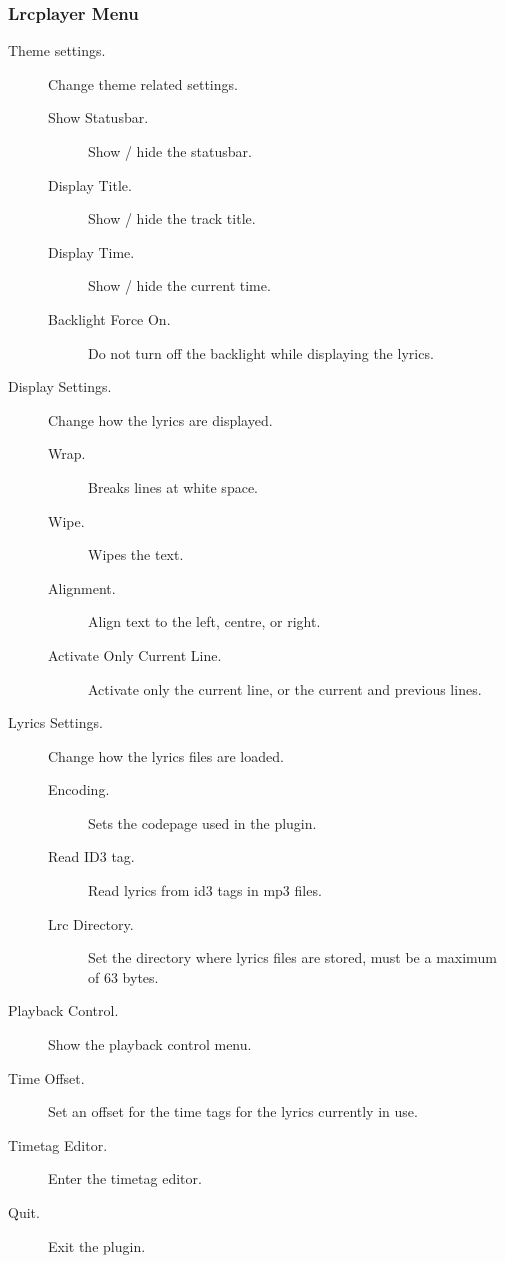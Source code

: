 \subsubsection{Lrcplayer Menu}

\begin{description}
  \item[Theme settings.] Change theme related settings.
  \begin{description}
    \item[Show Statusbar.] Show / hide the statusbar.
    \item[Display Title.] Show / hide the track title.
    \item[Display Time.] Show / hide the current time.
    \item[Backlight Force On.] Do not turn off the backlight while displaying
         the lyrics.
  \end{description}
  \item[Display Settings.] Change how the lyrics are displayed.
  \begin{description}
    \item[Wrap.] Breaks lines at white space.
    \item[Wipe.] Wipes the text.
    \item[Alignment.] Align text to the left, centre, or right.
    \item[Activate Only Current Line.]
        Activate only the current line, or the current and previous lines.
  \end{description}
  \item[Lyrics Settings.] Change how the lyrics files are loaded.
  \begin{description}
    \item[Encoding.] Sets the codepage used in the plugin.
    \item[Read ID3 tag.] Read lyrics from id3 tags in mp3 files.
    \item[Lrc Directory.] Set the directory where lyrics files are stored,
      must be a maximum of 63 bytes.
  \end{description}
  \item[Playback Control.] Show the playback control menu.
  \item[Time Offset.] Set an offset for the time tags for the lyrics currently in use.
  \item[Timetag Editor.] Enter the timetag editor.
  \item[Quit.] Exit the plugin.
\end{description}


